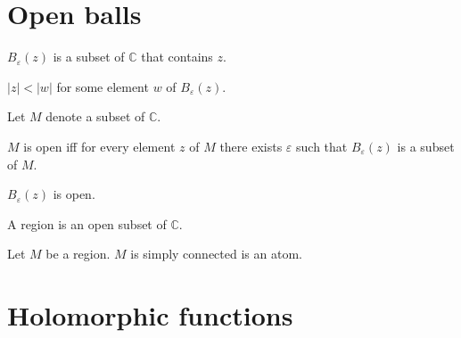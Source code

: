 \documentclass{article}
\newcommand{\Ball}[2]{B_{#1}(#2)}
\begin{document}
  \section{Open balls}

  \begin{forthel}

    \begin{signature}
      $\Ball{\varepsilon}{z}$ is a subset of $\mathbb{C}$ that contains $z$.
    \end{signature}

    \begin{axiom}
      $|z| < |w|$ for some element $w$ of $\Ball{\varepsilon}{z}$.
    \end{axiom}

Let $M$ denote a subset of $\mathbb{C}$.

    \begin{definition}
      $M$ is open iff for every element $z$ of $M$ there exists $\varepsilon$ such that
        $\Ball{\varepsilon}{z}$ is a subset of $M$.
    \end{definition}

    \begin{axiom}
      $\Ball{\varepsilon}{z}$ is open.
    \end{axiom}

\begin{signature} A region is an open subset of $\mathbb{C}$.
\end{signature}

\begin{signature} Let $M$ be a region. $M$ is simply connected is an atom.
\end{signature}
\end{forthel}

\section{Holomorphic functions}
\end{document}
